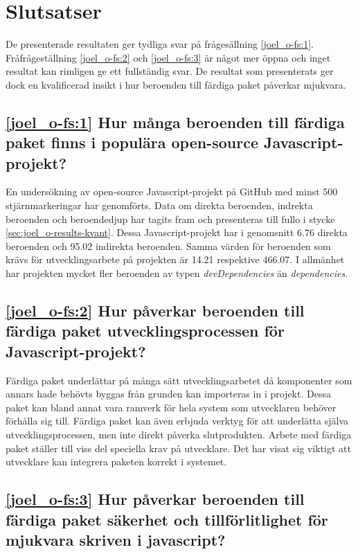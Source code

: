 \section{Slutsatser}
\label{sec:joel_o-conclusion}
De presenterade resultaten ger tydliga svar på frågesällning \ref{joel_o-fs:1}. Fråfrågeställning \ref{joel_o-fs:2} och \ref{joel_o-fs:3} är något mer öppna och inget resultat kan rimligen ge ett fullständig svar. De resultat som presenterats ger dock en kvalificerad insikt i hur beroenden till färdiga paket påverkar mjukvara.

\subsection*{\ref{joel_o-fs:1} Hur många beroenden till färdiga paket finns i populära open-source Javascript-projekt?}

En undersökning av open-source Javascript-projekt på GitHub med minst 500 stjärnmarkeringar har genomförts. Data om direkta beroenden, indrekta beroenden och beroendedjup har tagits fram och presenteras till fullo i stycke \ref{sec:joel_o-results-kvant}. Dessa Javascript-projekt har i genomsnitt 6.76 direkta beroenden och 95.02 indirekta beroenden. Samma värden för beroenden som krävs för utvecklingsarbete på projekten är 14.21 respektive 466.07. I allmänhet har projekten mycket fler beroenden av typen \textit{devDependencies} än \textit{dependencies}.

\subsection*{\ref{joel_o-fs:2} Hur påverkar beroenden till färdiga paket utvecklingsprocessen för Javascript-projekt?}

Färdiga paket underlättar på många sätt utvecklingsarbetet då komponenter som annars hade behövts byggas från grunden kan importeras in i projekt. Dessa paket kan bland annat vara ramverk för hela system som utvecklaren behöver förhålla sig till. Färdiga paket kan även erbjuda verktyg för att underlätta själva utvecklingsprocessen, men inte direkt påverka slutprodukten. Arbete med färdiga paket ställer till viss del speciella krav på utvecklare. Det har visat sig viktigt att utvecklare kan integrera paketen korrekt i systemet.

\subsection*{\ref{joel_o-fs:3} Hur påverkar beroenden till färdiga paket säkerhet och tillförlitlighet för mjukvara skriven i javascript?}

